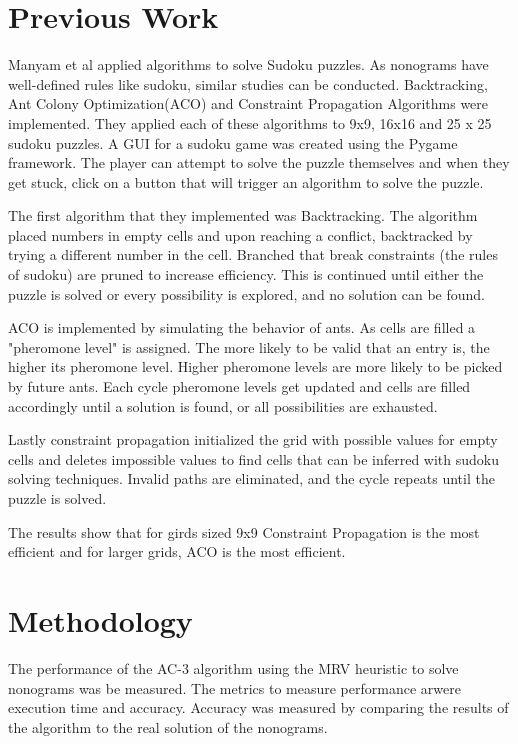 \documentclass[12pt, letterpaper]
{article}
\begin{document}
\section{Previous Work}
    Manyam et al \cite{10863160} applied algorithms to solve Sudoku puzzles. As nonograms have well-defined rules like sudoku, similar studies can be conducted. Backtracking, Ant Colony Optimization(ACO) and Constraint Propagation Algorithms were implemented. They applied each of these algorithms to 9x9, 16x16 and 25 x 25 sudoku puzzles. A GUI for a sudoku game was created using the Pygame framework. The player can attempt to solve the puzzle themselves and when they get stuck, click on a button that will trigger an algorithm to solve the puzzle.

    The first algorithm that they implemented was Backtracking. The algorithm placed numbers in empty cells and upon reaching a conflict, backtracked by trying a different number in the cell. Branched that break constraints (the rules of sudoku) are pruned to increase efficiency. This is continued until either the puzzle is solved or every possibility is explored, and no solution can be found.

    ACO is implemented by simulating the behavior of ants. As cells are filled a "pheromone level" is assigned. The more likely to be valid that an entry is, the higher its pheromone level. Higher pheromone levels are more likely to be picked by future ants. Each cycle pheromone levels get updated and cells are filled accordingly until a solution is found, or all possibilities are exhausted.

    Lastly constraint propagation initialized the grid with possible values for empty cells and deletes impossible values to find cells that can be inferred with sudoku solving techniques. Invalid paths are eliminated, and the cycle repeats until the puzzle is solved.

    The results show that for girds sized 9x9 Constraint Propagation is the most efficient and for larger grids, ACO is the most efficient.

\section{Methodology}
The performance of the AC-3 algorithm using the MRV heuristic to solve nonograms was be measured. The metrics to measure performance arwere execution time and accuracy. Accuracy was measured by comparing the results of the algorithm to the real solution of the nonograms.
\end{document}
